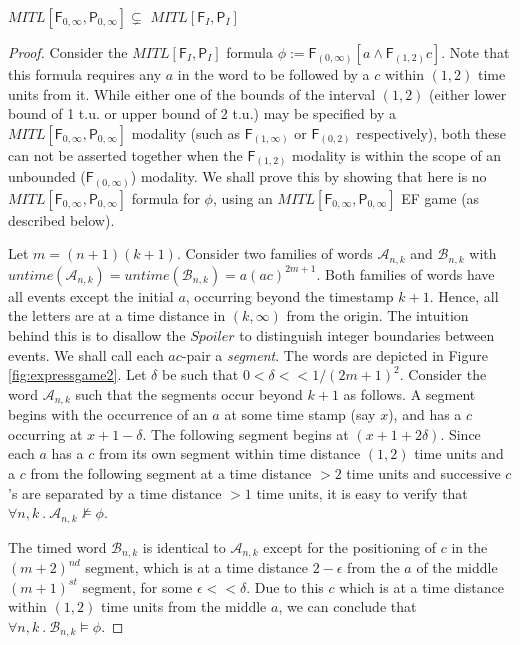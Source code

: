 \documentclass{llncs}
\newcommand{\fut}{\textsf{F}}
\newcommand{\past}{\textsf{P}}
\newcommand{\mitlfp}{\mbox{$\mathit{MITL[\fut_I,\past_I]}$}}
\newcommand{\ssp}{\mbox{$\mathit{Spoiler}$}}
\newcommand{\aaa}{\mathcal A}
\newcommand{\bbb}{\mathcal B}
\newcommand{\mitlfpzinf}{\mbox{$\mathit{MITL[\fut_{0,\infty},\past_{0,\infty}]}$}}
\begin{document}
\begin{theorem}
\mitlfpzinf $\subsetneq$ \mitlfp
\end{theorem}
\begin{proof}
Consider the \mitlfp\/ formula $\phi:= \fut_{(0,\infty)}[a\land \fut_{(1,2)}c]$. Note that this formula requires any $a$ in the word to be followed by a $c$ within $(1,2)$ time units from it. While either one of the bounds of the interval $(1,2)$ (either lower bound of 1 t.u. or upper bound of 2 t.u.) may be specified by a \mitlfpzinf\/ modality (such as $\fut_{(1,\infty)}$ or $\fut_{(0,2)}$ respectively), both these can not be asserted together when the $\fut_{(1,2)}$ modality is within the scope of an unbounded ($\fut_{(0,\infty)}$) modality. We shall prove this by showing that here is no \mitlfpzinf\/ formula for $\phi$, using an \mitlfpzinf\/ EF game (as described below).

Let $m=(n+1)(k+1)$. Consider two families of words $\aaa_{n,k}$ and $\bbb_{n,k}$ with $untime(\aaa_{n,k}) = untime(\bbb_{n,k}) = a (ac)^{2m+1}$. Both families of words have all events except the initial $a$, occurring beyond the timestamp $k+1$. Hence, all the letters are at a time distance in $(k,\infty)$ from the origin. The intuition behind this is to disallow the \ssp\/ to distinguish integer boundaries between events. 
We shall call each $ac$-pair a \emph{segment}. The words are depicted in Figure \ref{fig:expressgame2}. Let $\delta$ be such that $0<\delta << 1/(2m+1)^2$. Consider the word $\aaa_{n,k}$ such that the segments occur beyond $k+1$ as follows. A segment begins with the occurrence of an $a$ at some time stamp (say $x$), and has a $c$ occurring at $x+1-\delta$. The following segment begins at $(x+1+2\delta)$. Since each $a$ has a $c$ from its own segment within time distance $(1,2)$ time units and a $c$ from the following segment at a time distance $>2$ time units and successive $c$'s are separated by a time distance $>1$ time units, it is easy to verify that $\forall n,k ~.~ \aaa_{n,k}\not\models\phi$.

The timed word $\bbb_{n,k}$ is identical to $\aaa_{n,k}$ except for the positioning of $c$ in the $(m+2)^{nd}$ segment, which is at a time distance $2-\epsilon$ from the $a$ of the middle $(m+1)^{st}$ segment, for some $\epsilon<<\delta$. Due to this $c$ which is at a time distance within $(1,2)$ time units from the middle $a$, we can conclude that $\forall n,k ~.~ \bbb_{n,k}\models \phi$.


\end{proof}
\end{document}
